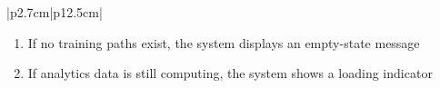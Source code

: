 \begin{table}[H]
\begin{tabular}{|p{2.7cm}|p{12.5cm}|}
\begin{minipage}[t]{\linewidth}
                                      \begin{enumerate}[topsep=0pt,itemsep=1pt,parsep=0pt,partopsep=0pt]
                                          \item If no training paths exist, the system displays an empty-state message
                                          \item If analytics data is still computing, the system shows a loading indicator
                                      \end{enumerate}
                                  \end{minipage}                   \\
        \hline
    \end{tabular}
    \label{tab:teacher-analytics}
\end{table}
